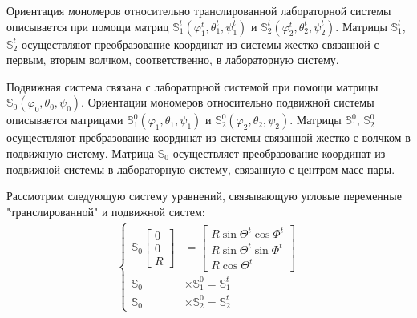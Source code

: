 \documentclass[14pt]{extarticle}
\newcommand{\bbS}{\mathbb{S}}
\begin{document}
Ориентация мономеров относительно транслированной лабораторной системы описывается при помощи матриц $\bbS_1^t (\varphi_1^t, \theta_1^t, \psi_1^t)$ и $\bbS_2^t (\varphi_2^t, \theta_2^t, \psi_2^t)$. Матрицы $\bbS_1^t$, $\bbS_2^t$ осуществляют преобразование координат из системы жестко связанной с первым, вторым волчком, соответственно, в лабораторную систему. \par
Подвижная система связана с лабораторной системой при помощи матрицы $\bbS_0 (\varphi_0, \theta_0, \psi_0)$.  Ориентации мономеров относительно подвижной системы описывается матрицами $\bbS_1^0 (\varphi_1, \theta_1, \psi_1)$ и $\bbS_2^0 (\varphi_2, \theta_2, \psi_2)$. Матрицы $\bbS_1^0$, $\bbS_2^0$ осуществляют пребразование координат из системы связанной жестко с волчком в подвижную систему. Матрица $\bbS_0$ осуществляет преобразование координат из подвижной системы в лабораторную систему, связанную с центром масс пары. \par 
Рассмотрим следующую систему уравнений, связывающую угловые переменные "транслированной"  и подвижной систем:
\begin{gather}
	\left\{
	\begin{aligned}
		\bbS_0 \begin{bmatrix} 0 \\ 0 \\ R \end{bmatrix} &= 
		\begin{bmatrix} 	R \sin \Theta^t \cos \Phi^t \\ R \sin \Theta^t \sin \Phi^t \\ R \cos \Theta^t \end{bmatrix} \\
		\bbS_0 &\times \bbS_1^0 = \bbS_1^t \\
		\bbS_0 &\times \bbS_2^0 = \bbS_2^t
	\end{aligned} 
	\right. \label{sys}
\end{gather} 
\end{document}

